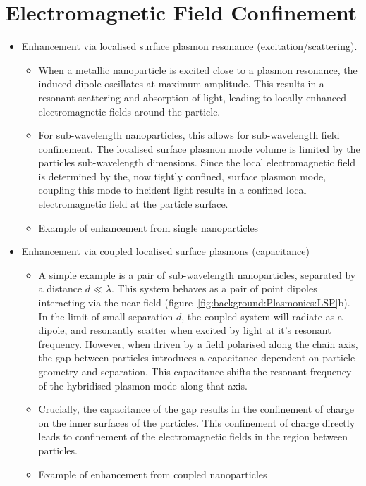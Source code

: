 \section{Electromagnetic Field Confinement}\label{sec:Plasmonics:confinement}
\begin{itemize}
    \item Enhancement via localised surface plasmon resonance (excitation/scattering). 
    \begin{itemize}
        \item When a metallic nanoparticle is excited close to a plasmon resonance, the induced dipole oscillates at maximum amplitude. This results in a resonant scattering and absorption of light, leading to locally enhanced electromagnetic fields around the particle. 
        \item For sub-wavelength nanoparticles, this allows for sub-wavelength field confinement. The localised surface plasmon mode volume is limited by the particles sub-wavelength dimensions. Since the local electromagnetic field is determined by the, now tightly confined, surface plasmon mode, coupling this mode to incident light results in a confined local electromagnetic field at the particle surface.
        \item Example of enhancement from single nanoparticles
    \end{itemize}
    \item Enhancement via coupled localised surface plasmons (capacitance)
        \begin{itemize}
            \item A simple example is a pair of sub-wavelength nanoparticles, separated by a distance $d \ll \lambda$. This system behaves as a pair of point dipoles interacting via the near-field (figure~\ref{fig:background:Plasmonics:LSP}b). In the limit of small separation $d$, the coupled system will radiate as a dipole, and resonantly scatter when excited by light at it's resonant frequency. However, when driven by a field polarised along the chain axis, the gap between particles introduces a capacitance dependent on particle geometry and separation. This capacitance shifts the resonant frequency of the hybridised plasmon mode along that axis.
            \item Crucially, the capacitance of the gap results in the confinement of charge on the inner surfaces of the particles. This confinement of charge directly leads to confinement of the electromagnetic fields in the region between particles.
            \item Example of enhancement from coupled nanoparticles

\end{itemize}
\end{itemize}
